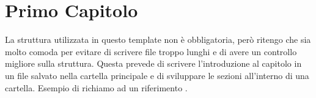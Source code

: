 \chapter{Primo Capitolo} %
\label{chapter:primo_capitolo} %
La struttura utilizzata in questo template non è obbligatoria, però ritengo che sia molto comoda per evitare di scrivere file troppo lunghi e di avere un controllo migliore sulla struttura. Questa prevede di scrivere l'introduzione al capitolo in un file salvato nella cartella principale e di sviluppare le sezioni all'interno di una cartella. Esempio di richiamo ad un riferimento \cite{Vas}.



